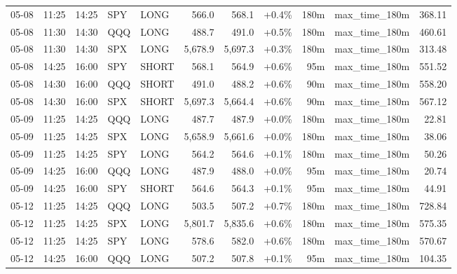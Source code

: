 \documentclass[11pt,a4paper,twoside]{article}
\begin{document}
\begin{center}
\begin{longtable}{>{\color{txtmain}}l l l l l r r r r >{\color{txtmain}}l r}
05-08 & 11:25 & 14:25 & SPY & LONG & 566.0 & 568.1 & \textcolor{wingreen}{+0.4\%} & 180m & max\_time\_180m & \textcolor{wingreen}{368.11} \\
05-08 & 11:30 & 14:30 & QQQ & LONG & 488.7 & 491.0 & \textcolor{wingreen}{+0.5\%} & 180m & max\_time\_180m & \textcolor{wingreen}{460.61} \\
05-08 & 11:30 & 14:30 & SPX & LONG & 5,678.9 & 5,697.3 & \textcolor{wingreen}{+0.3\%} & 180m & max\_time\_180m & \textcolor{wingreen}{313.48} \\
05-08 & 14:25 & 16:00 & SPY & SHORT & 568.1 & 564.9 & \textcolor{wingreen}{+0.6\%} & 95m & max\_time\_180m & \textcolor{wingreen}{551.52} \\
05-08 & 14:30 & 16:00 & QQQ & SHORT & 491.0 & 488.2 & \textcolor{wingreen}{+0.6\%} & 90m & max\_time\_180m & \textcolor{wingreen}{558.20} \\
05-08 & 14:30 & 16:00 & SPX & SHORT & 5,697.3 & 5,664.4 & \textcolor{wingreen}{+0.6\%} & 90m & max\_time\_180m & \textcolor{wingreen}{567.12} \\
05-09 & 11:25 & 14:25 & QQQ & LONG & 487.7 & 487.9 & \textcolor{wingreen}{+0.0\%} & 180m & max\_time\_180m & \textcolor{wingreen}{22.81} \\
05-09 & 11:25 & 14:25 & SPX & LONG & 5,658.9 & 5,661.6 & \textcolor{wingreen}{+0.0\%} & 180m & max\_time\_180m & \textcolor{wingreen}{38.06} \\
05-09 & 11:25 & 14:25 & SPY & LONG & 564.2 & 564.6 & \textcolor{wingreen}{+0.1\%} & 180m & max\_time\_180m & \textcolor{wingreen}{50.26} \\
05-09 & 14:25 & 16:00 & QQQ & LONG & 487.9 & 488.0 & \textcolor{wingreen}{+0.0\%} & 95m & max\_time\_180m & \textcolor{wingreen}{20.74} \\
05-09 & 14:25 & 16:00 & SPY & SHORT & 564.6 & 564.3 & \textcolor{wingreen}{+0.1\%} & 95m & max\_time\_180m & \textcolor{wingreen}{44.91} \\
05-12 & 11:25 & 14:25 & QQQ & LONG & 503.5 & 507.2 & \textcolor{wingreen}{+0.7\%} & 180m & max\_time\_180m & \textcolor{wingreen}{728.84} \\
05-12 & 11:25 & 14:25 & SPX & LONG & 5,801.7 & 5,835.6 & \textcolor{wingreen}{+0.6\%} & 180m & max\_time\_180m & \textcolor{wingreen}{575.35} \\
05-12 & 11:25 & 14:25 & SPY & LONG & 578.6 & 582.0 & \textcolor{wingreen}{+0.6\%} & 180m & max\_time\_180m & \textcolor{wingreen}{570.67} \\
05-12 & 14:25 & 16:00 & QQQ & LONG & 507.2 & 507.8 & \textcolor{wingreen}{+0.1\%} & 95m & max\_time\_180m & \textcolor{wingreen}{104.35} \\

\end{longtable}
\end{center}
\end{document}
